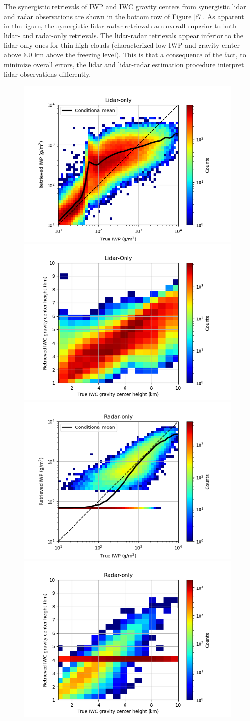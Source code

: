 \documentclass{ametsocV6.1}
\begin{document}
The synergistic retrievals of IWP and IWC gravity centers from synergistic lidar and radar observations are shown in the bottom row of Figure \ref{f7}.  As apparent in the figure, the synergistic lidar-radar retrievals are overall superior to both lidar- and radar-only retrievals. The lidar-radar retrievals appear inferior to the lidar-only ones for thin high clouds (characterized low IWP and gravity center above 8.0 km above the freezing level). This is that a consequence of the fact, to minimize overall errors, the lidar and lidar-radar estimation procedure interpret lidar observations differently.  

\begin{figure}
    \centering
    \includegraphics[width=.481\linewidth]{fig07a.rev.png}
    \includegraphics[width=.481\linewidth]{fig07c.rev.png}
    \includegraphics[width=.481\linewidth]{fig07b.rev.png}
    \includegraphics[width=.481\linewidth]{fig07d.rev.png}

\end{figure}
\end{document}

